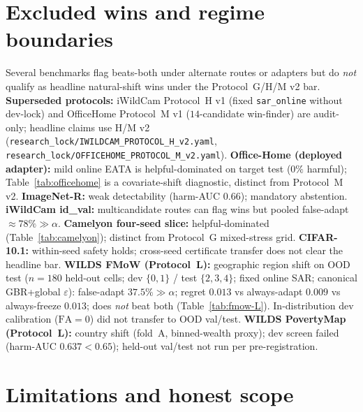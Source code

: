 \documentclass[conference]{IEEEtran}
\theoremstyle{plain}
\theoremstyle{definition}
\begin{document}
\section{Excluded wins and regime boundaries}\label{sec:excluded-wins}
Several benchmarks flag beats-both under alternate routes or adapters but do \emph{not} qualify
as headline natural-shift wins under the Protocol~G/H/M v2 bar. \textbf{Superseded protocols:}
iWildCam Protocol~H v1 (fixed \texttt{sar\_online} without dev-lock) and OfficeHome Protocol~M v1
($14$-candidate win-finder) are audit-only; headline claims use H/M v2
(\texttt{research\_lock/IWILDCAM\_PROTOCOL\_H\_v2.yaml},
\texttt{research\_lock/OFFICEHOME\_PROTOCOL\_M\_v2.yaml}).
\textbf{Office-Home (deployed adapter):} mild online EATA is helpful-dominated on target test
($0\%$ harmful); Table~\ref{tab:officehome} is a covariate-shift diagnostic, distinct from
Protocol~M v2. \textbf{ImageNet-R:} weak detectability (harm-AUC $0.66$); mandatory abstention.
\textbf{iWildCam id\_val:} multicandidate routes can flag wins but pooled false-adapt $\approx 78\%\gg\alpha$.
\textbf{Camelyon four-seed slice:} helpful-dominated (Table~\ref{tab:camelyon}); distinct from
Protocol~G mixed-stress grid. \textbf{CIFAR-10.1:} within-seed safety holds; cross-seed certificate
transfer does not clear the headline bar.
\textbf{WILDS FMoW (Protocol~L):} geographic region shift on OOD test
($n{=}180$ held-out cells; dev $\{0,1\}$ / test $\{2,3,4\}$; fixed online SAR;
canonical GBR+global $\varepsilon$): false-adapt $37.5\%\gg\alpha$; regret
$0.013$ vs always-adapt $0.009$ vs always-freeze $0.013$; does \emph{not} beat both
(Table~\ref{tab:fmow-L}). In-distribution dev calibration ($\mathrm{FA}{=}0$) did not
transfer to OOD val/test.
\textbf{WILDS PovertyMap (Protocol~L):} country shift (fold~A, binned-wealth proxy);
dev screen failed (harm-AUC $0.637{<}0.65$); held-out val/test not run per
pre-registration.

\clearpage

\section{Limitations and honest scope}\label{sec:limits}
\begin{center}
\end{center}
\end{document}
